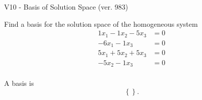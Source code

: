 \begin{exercise}
  \begin{exerciseTitle}V10 - Basis of Solution Space (ver. 983)\end{exerciseTitle}
  \begin{exerciseStatement}
    Find a basis for the solution space of the homogeneous system 
\begin{align*}
 1 x_ 1 -1 x_ 2 -5 x_ 3 &= 0  \\ 
  -6 x_ 1 -1 x_ 3 &= 0  \\ 
  5 x_ 1 + 5 x_ 2 + 5 x_ 3 &= 0  \\ 
  -5 x_ 2 -1 x_ 3 &= 0  \\ 
 \end{align*}


 
  \end{exerciseStatement}

  \begin{exerciseAnswer}
   A basis is   
\[\left\{\right\}.\]

  


  \end{exerciseAnswer}
\end{exercise}